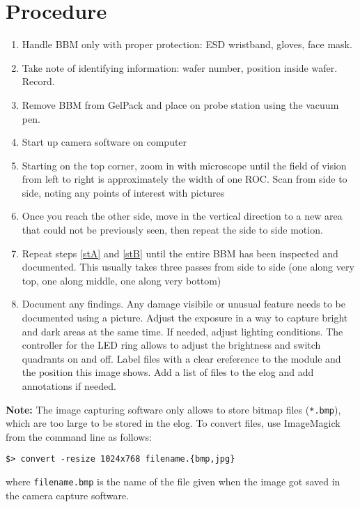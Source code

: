 \documentclass[12pt]{unlsilabsop}
\begin{document}
\section{Procedure}

\begin{enumerate}
    \item Handle BBM only with proper protection: ESD wristband, gloves, face mask.
    \item Take note of identifying information: wafer number, position inside wafer. Record.
    \item Remove BBM from GelPack and place on probe station using the vacuum pen. 
    \item Start up camera software on computer
    \item \label{stA} Starting on the top corner, zoom in with microscope until the field of vision from left to right is approximately the width of one ROC.  Scan from side to side, noting any points of interest with pictures
    \item \label{stB} Once you reach the other side, move in the vertical direction to a new area that could not be previously seen, then repeat the side to side motion.
    \item Repeat steps \ref{stA} and \ref{stB} until the entire BBM has been inspected and documented.  This usually takes three passes from side to side (one along very top, one along middle, one along very bottom)
    \item Document any findings. Any damage visibile or unusual feature needs to be documented using a picture. Adjust the exposure in a way to capture bright and dark areas at the same time. If needed, adjust lighting conditions. The controller for the LED ring allows to adjust the brightness and switch quadrants on and off. Label files with a clear ereference to the module and the position this image shows. Add a list of files to the elog and add annotations if needed.
\end{enumerate}
\textbf{Note:} The image capturing software only allows to store bitmap files (\texttt{*.bmp}), which are too large to be stored in the elog. To convert files, use ImageMagick from the command line as follows:

\medskip

\texttt{\$> convert -resize 1024x768 filename.\{bmp,jpg\}}

\medskip

where \texttt{filename.bmp} is the name of the file given when the image got saved in the camera capture software.
\end{document}
